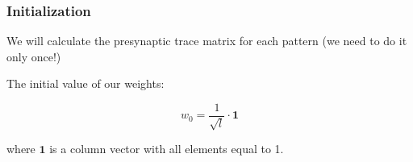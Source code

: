 \subsubsection{Initialization}

We will calculate the presynaptic trace matrix for each pattern (we need to do it only once!)

The initial value of our weights:

\begin{equation}
    w_0 = \frac{1}{\sqrt{l}} \cdot \mathbf{1}
\end{equation}

where $\mathbf{1}$ is a column vector with all elements equal to 1.
